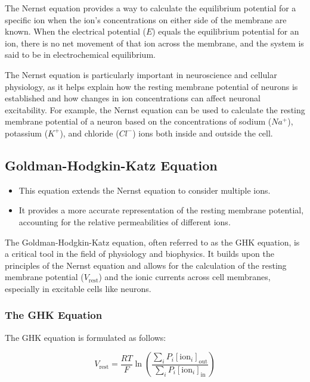 \documentclass{article}
\begin{document}
The Nernst equation provides a way to calculate the equilibrium potential for a specific ion when the ion's concentrations on either side of the membrane are known. When the electrical potential (\(E\)) equals the equilibrium potential for an ion, there is no net movement of that ion across the membrane, and the system is said to be in electrochemical equilibrium.

The Nernst equation is particularly important in neuroscience and cellular physiology, as it helps explain how the resting membrane potential of neurons is established and how changes in ion concentrations can affect neuronal excitability. For example, the Nernst equation can be used to calculate the resting membrane potential of a neuron based on the concentrations of sodium (\(Na^+\)), potassium (\(K^+\)), and chloride (\(Cl^-\)) ions both inside and outside the cell.


\subsection{Goldman-Hodgkin-Katz Equation}
\begin{itemize}
    \item This equation extends the Nernst equation to consider multiple ions. 
    \item It provides a more accurate representation of the resting membrane potential, accounting for the relative permeabilities of different ions.
\end{itemize}
The Goldman-Hodgkin-Katz equation, often referred to as the GHK equation, is a critical tool in the field of physiology and biophysics. It builds upon the principles of the Nernst equation and allows for the calculation of the resting membrane potential (\(V_{\text{rest}}\)) and the ionic currents across cell membranes, especially in excitable cells like neurons.

\subsubsection{The GHK Equation}

The GHK equation is formulated as follows:

\[
V_{\text{rest}} = \frac{RT}{F} \ln \left(\frac{\sum_i P_i[\text{ion}_i]_{\text{out}}}{\sum_i P_i[\text{ion}_i]_{\text{in}}}\right)
\]
\end{document}
